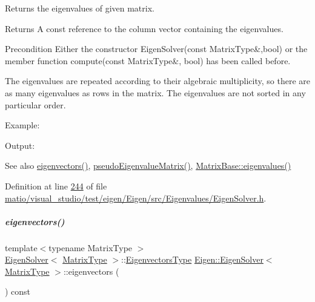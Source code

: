 Returns the eigenvalues of given matrix. 

\begin{DoxyReturn}{Returns}
A const reference to the column vector containing the eigenvalues.
\end{DoxyReturn}
\begin{DoxyPrecond}{Precondition}
Either the constructor Eigen\+Solver(const Matrix\+Type\&,bool) or the member function compute(const Matrix\+Type\&, bool) has been called before.
\end{DoxyPrecond}
The eigenvalues are repeated according to their algebraic multiplicity, so there are as many eigenvalues as rows in the matrix. The eigenvalues are not sorted in any particular order.

Example\+: 
\begin{DoxyCodeInclude}
\end{DoxyCodeInclude}
 Output\+: 
\begin{DoxyVerbInclude}
\end{DoxyVerbInclude}


\begin{DoxySeeAlso}{See also}
\hyperlink{group___eigenvalues___module_a66288022802172e3ee059283b26201d7}{eigenvectors()}, \hyperlink{group___eigenvalues___module_a4979eafe0aeef06b19ada7fa5e19db17}{pseudo\+Eigenvalue\+Matrix()}, \hyperlink{group___core___module_a30430fa3d5b4e74d312fd4f502ac984d}{Matrix\+Base\+::eigenvalues()} 
\end{DoxySeeAlso}


Definition at line \hyperlink{matio_2visual__studio_2test_2eigen_2_eigen_2src_2_eigenvalues_2_eigen_solver_8h_source_l00244}{244} of file \hyperlink{matio_2visual__studio_2test_2eigen_2_eigen_2src_2_eigenvalues_2_eigen_solver_8h_source}{matio/visual\+\_\+studio/test/eigen/\+Eigen/src/\+Eigenvalues/\+Eigen\+Solver.\+h}.

\mbox{\label{group___eigenvalues___module_a66288022802172e3ee059283b26201d7}} 
\subparagraph{\texorpdfstring{eigenvectors()}{eigenvectors()}\hspace{0.1cm}{\footnotesize\ttfamily [1/2]}}
{\footnotesize\ttfamily template$<$typename Matrix\+Type $>$ \\
\hyperlink{group___eigenvalues___module_class_eigen_1_1_eigen_solver}{Eigen\+Solver}$<$ \hyperlink{group___eigenvalues___module_a83acd180404ddaac8a678fa65a6b632b}{Matrix\+Type} $>$\+::\hyperlink{group___eigenvalues___module_aa140354e2f7d5ce34c6488c39e19f2c2}{Eigenvectors\+Type} \hyperlink{group___eigenvalues___module_class_eigen_1_1_eigen_solver}{Eigen\+::\+Eigen\+Solver}$<$ \hyperlink{group___eigenvalues___module_a83acd180404ddaac8a678fa65a6b632b}{Matrix\+Type} $>$\+::eigenvectors (\begin{DoxyParamCaption}{ }\end{DoxyParamCaption}) const}



